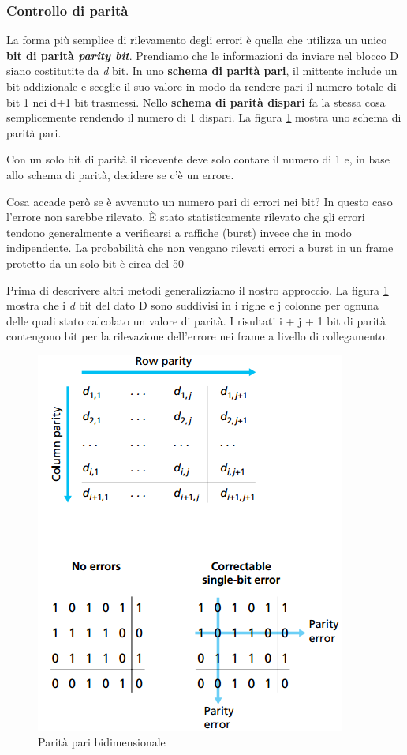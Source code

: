 \documentclass[11pt,a4paper]{article}
\begin{document}
\subsubsection{Controllo di parità}
La forma più semplice di rilevamento degli errori è quella che utilizza un unico \textbf{bit di parità \textit{parity bit}}. Prendiamo che le informazioni da inviare nel blocco D siano costitutite da \emph{d} bit. In uno \textbf{schema di parità pari}, il mittente include un bit addizionale e sceglie il suo valore in modo da rendere pari il numero totale di bit 1 nei d+1 bit trasmessi. Nello \textbf{schema di parità dispari} fa la stessa cosa semplicemente rendendo il numero di 1 dispari. La figura \ref{fig: 072} mostra uno schema di parità pari.

Con un solo bit di parità il ricevente deve solo contare il numero di 1 e, in base allo schema di parità, decidere se c'è un errore.

Cosa accade però se è avvenuto un numero pari di errori nei bit? In questo caso l'errore non sarebbe rilevato. È stato statisticamente rilevato che gli errori tendono generalmente a verificarsi a raffiche (burst) invece che in modo indipendente. La probabilità che non vengano rilevati errori a burst in un frame protetto da un solo bit è circa del 50%

Prima di descrivere altri metodi generalizziamo il nostro approccio. La figura \ref{fig: 072} mostra che i \emph{d} bit del dato D sono suddivisi in i righe e j colonne per ognuna delle quali  stato calcolato un valore di parità. I risultati i + j + 1 bit di parità contengono bit per la rilevazione dell'errore nei frame a livello di collegamento.
\begin{figure}
	\begin{center}
		\includegraphics[scale=0.6]{img/072.png}
		\caption{Parità pari bidimensionale}
		\label{fig: 072}
	\end{center}
\end{figure}
\end{document}
